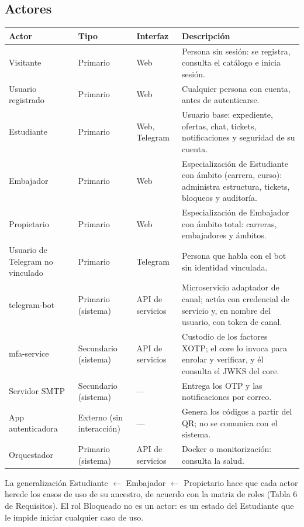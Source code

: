 \documentclass[11pt,a4paper]{report}
\begin{document}
\subsection{Actores}
\begin{center}\small
\begin{tabularx}{\linewidth}{@{}p{3.6cm}p{2.6cm}p{2.3cm}X@{}}
\toprule
Actor & Tipo & Interfaz & Descripción \\
\midrule
Visitante & Primario & Web & Persona sin sesión: se registra, consulta el catálogo e inicia sesión.\\
Usuario registrado & Primario & Web & Cualquier persona con cuenta, antes de autenticarse.\\
Estudiante & Primario & Web, Telegram & Usuario base: expediente, ofertas, chat, tickets, notificaciones y seguridad de su cuenta.\\
Embajador & Primario & Web & Especialización de Estudiante con ámbito (carrera, curso): administra estructura, tickets, bloqueos y auditoría.\\
Propietario & Primario & Web & Especialización de Embajador con ámbito total: carreras, embajadores y ámbitos.\\
Usuario de Telegram no vinculado & Primario & Telegram & Persona que habla con el bot sin identidad vinculada.\\
telegram-bot & Primario (sistema) & API de servicios & Microservicio adaptador de canal; actúa con credencial de servicio y, en nombre del usuario, con token de canal.\\
mfa-service & Secundario (sistema) & API de servicios & Custodio de los factores XOTP; el core lo invoca para enrolar y verificar, y él consulta el JWKS del core.\\
Servidor SMTP & Secundario (sistema) & — & Entrega los OTP y las notificaciones por correo.\\
App autenticadora & Externo (sin interacción) & — & Genera los códigos a partir del QR; no se comunica con el sistema.\\
Orquestador & Primario (sistema) & API de servicios & Docker o monitorización: consulta la salud.\\
\bottomrule
\end{tabularx}
\end{center}
La generalización Estudiante $\leftarrow$ Embajador $\leftarrow$ Propietario hace que cada actor herede los casos de uso de su ancestro, de acuerdo con la matriz de roles (Tabla 6 de Requisitos). El rol Bloqueado no es un actor: es un estado del Estudiante que le impide iniciar cualquier caso de uso.
\end{document}
